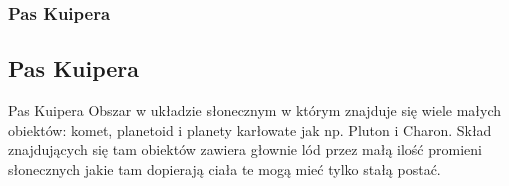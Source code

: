 \begin{frame}
\frametitle{Pas Kuipera}
\subsection{Pas Kuipera}
Pas Kuipera Obszar w układzie słonecznym w którym znajduje się wiele małych obiektów: komet, planetoid i planety karłowate jak np. Pluton i Charon. Skład znajdujących się tam obiektów zawiera głownie lód przez małą ilość promieni słonecznych jakie tam dopierają ciała te mogą mieć tylko stałą postać. 
\end{frame}


